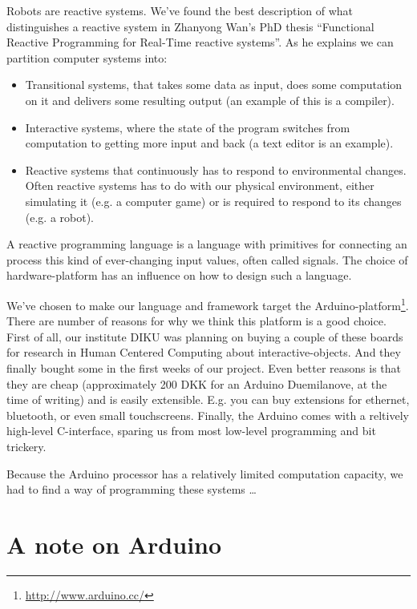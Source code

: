 \documentclass[a4paper, oneside, final]{memoir}
\begin{document}
Robots are reactive systems. We've found the best description of what
distinguishes a reactive system in Zhanyong Wan's PhD
thesis "`Functional Reactive Programming for Real-Time reactive
systems"'.  As he explains we can
partition computer systems into:
\begin{itemize}
\item Transitional systems, that takes some data as input, does some
  computation on it and delivers some resulting output (an example of this
  is a compiler).
\item Interactive systems, where the state of the program switches
  from computation to getting more input and back (a text editor is an
  example).
\item Reactive systems that continuously has to respond to
  environmental changes. Often reactive systems has to do with our
  physical environment, either simulating it (e.g. a computer game) or
  is required to respond to its changes (e.g. a robot).
\end{itemize}

A reactive programming language is a language with primitives for connecting an
process this kind of ever-changing input values, often called signals. The
choice of hardware-platform has an influence on how to design such a language.

We've chosen to make our language and framework target the
Arduino-platform\footnote{\url{http://www.arduino.cc/}}.  There are number of
reasons for why we think this platform is a good choice. First of all, our
institute DIKU was planning on buying a couple of these boards for research in
Human Centered Computing about interactive-objects. And they finally bought some in
the first weeks of our project. Even better reasons is that they are cheap
(approximately 200 DKK for an Arduino Duemilanove, at the time of writing) and
is easily extensible. E.g. you can buy extensions for ethernet, bluetooth, or
even small touchscreens. Finally, the Arduino comes with a reltively high-level
C-interface, sparing us from most low-level programming and bit trickery.

Because the Arduino processor has a relatively limited computation capacity, we
had to find a way of programming these systems \ldots


\section{A note on Arduino}
\end{document}
